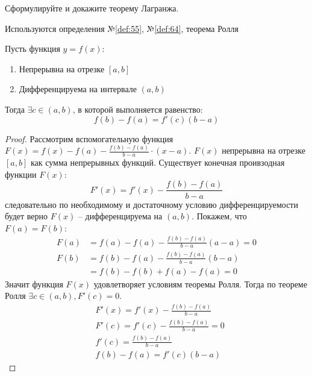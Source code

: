 \begin{question}
    Сформулируйте и докажите теорему Лагранжа.
\end{question}
\begin{used}
    Используются определения №\ref{def:55}, №\ref{def:64}, теорема Ролля
\end{used}
\begin{theorem}
    Пусть функция $y = f(x)$:
    \begin{enumerate}
        \item Непрерывна на отрезке $[a, b]$
        \item Дифференцируема на интервале  $(a, b)$
    \end{enumerate}
    Тогда $\exists  c \in (a, b)$, в которой выполняется равенство: \[
        f(b) - f(a) = f'(c)(b - a)
    \] 
\end{theorem}
\begin{proof}
    Рассмотрим вспомогательную функция $F(x) = f(x) - f(a) - \frac{f(b) - f(a)}{b - a} \cdot (x - a)$. 
    $F(x)$ непрерывна на отрезке $[a, b]$ как сумма непрерывных функций. Существует конечная проивзодная функции $F(x)$: \[
        F'(x) = f'(x) - \frac{f(b) - f(a)}{b - a}
    \]
    следовательно по необходимому и достаточному условию дифференцируемости будет верно $F(x)$ -- дифференцируема на $(a, b)$.
    Покажем, что $F(a) = F(b)$:
    \begin{align*}
        F(a) &= f(a) - f(a) - \frac{f(b) - f(a)}{b - a}(a - a) = 0 \\
        F(b) &= f(b) - f(a) - \frac{f(b) - f(a)}{b - a}(b - a) \\
             &= f(b) - f(b) + f(a) - f(a) = 0
    \end{align*}
    Значит функция $F(x)$ удовлетворяет условиям теоремы Ролля. Тогда по теореме Ролля  $\exists c \in (a, b), F'(c) = 0$.
    \begin{align*}
        & F'(x) = f'(x) - \frac{f(b) - f(a)}{b - a} \\
        & F'(c) = f'(c) - \frac{f(b) - f(a)}{b - a} = 0 \\
        & f'(c) = \frac{f(b) - f(a)}{b - a} \\
        & f(b) - f(a) = f'(c) (b - a)
    \end{align*}
\end{proof}
\pagebreak



